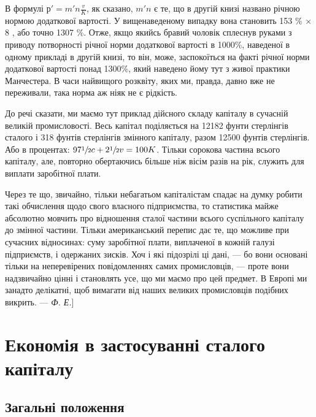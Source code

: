 В формулі $р' = m'n \frac{v}{K}$, як сказано, $m'n$ є те, що в другій
книзі названо річною нормою додаткової вартості. У вищенаведеному
випадку вона становить 153 \% × 8 , або точно
1307 \%. Отже, якщо якийсь бравий чоловік сплеснув руками
з приводу потворності річної норми додаткової вартості в 1000\%,
наведеної в одному прикладі в другій книзі, то він, може, заспокоїться
на факті річної норми додаткової вартості понад
1300\%, який наведено йому тут з живої практики Манчестера.
В часи найвищого розквіту, яких ми, правда, давно вже не переживали,
така норма аж ніяк не є рідкість.

До речі сказати, ми маємо тут приклад дійсного складу капіталу
в сучасній великій промисловості. Весь капітал поділяється на
12182 фунти стерлінгів сталого і 318 фунтів стерлінгів змінного
капіталу, разом 12500 фунтів стерлінгів. Або в процентах:
$97 \sfrac{1}{2}c+ 2 \sfrac{1}{2}v = 100K$. Тільки сорокова частина всього капіталу,
але, повторно обертаючись більше ніж вісім разів на рік, служить
для виплати заробітної плати.

Через те що, звичайно, тільки небагатьом капіталістам спадає
на думку робити такі обчислення щодо свого власного підприємства,
то статистика майже абсолютно мовчить про відношення
сталої частини всього суспільного капіталу до змінної
частини. Тільки американський перепис дає те, що можливе при
сучасних відносинах: суму заробітної плати, виплаченої в кожній
галузі підприємств, і одержаних зисків. Хоч і які підозрілі ці
дані, — бо вони основані тільки на неперевірених повідомленнях
самих промисловців, — проте вони надзвичайно цінні і становлять
усе, що ми маємо про цей предмет. В Европі ми занадто делікатні,
щоб вимагати від наших великих промисловців подібних
викрить. — \emph{Ф. Е.}]

\section{Економія в застосуванні сталого капіталу}

\subsection{Загальні положення}


